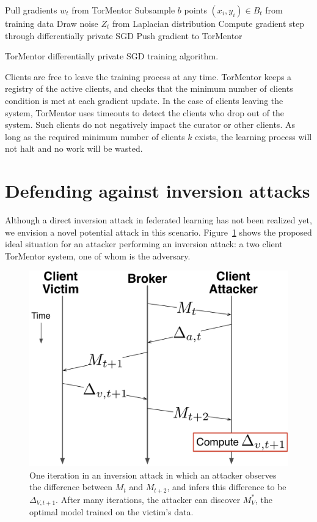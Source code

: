 \begin{algorithm}
   {
    Pull gradients $w_t$ from TorMentor\;
    Subsample $b$ points $(x_i, y_i) \in B_t$ from training data\;
    Draw noise $Z_t$ from Laplacian distribution\;
    Compute gradient step through differentially private SGD\;
    Push gradient to TorMentor
  }
  \caption{TorMentor differentially private SGD training algorithm.
  \label{alg:training}}
\end{algorithm}

Clients are free to leave the training process at any time. TorMentor
keeps a registry of the active clients, and checks that the minimum
number of clients condition is met at each gradient update. In
the case of clients leaving the system, TorMentor uses timeouts to
detect the clients who drop out of the system. Such clients do not
negatively impact the curator or other clients. As long as the required
minimum number of clients $k$ exists, the learning process will not
halt and no work will be wasted.

\section{Defending against inversion attacks}

Although a direct inversion attack in federated learning has not
been realized yet, we envision a novel potential attack in this
scenario. Figure~\ref{fig:inversion-timespace} shows the proposed ideal
situation for an attacker performing an inversion attack: a two client
TorMentor system, one of whom is the adversary.

\begin{figure}[h]
  \centering
  \includegraphics[width=.8\linewidth]{fig/inversionattack.pdf}
  \caption{One iteration in an inversion attack in which an attacker
    observes the difference between $M_t$ and $M_{t+2}$, and infers
    this difference to be $\Delta_{V,t+1}$. After many iterations,
    the attacker can discover $M^*_V$, the optimal model trained on
    the victim's data.}
  \label{fig:inversion-timespace}
\end{figure}


